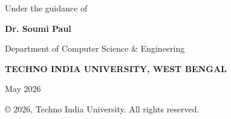 \documentclass[oneside]{ecsproject}     %
\begin{document}
\begin{titlepage}
\vspace{0.2cm}

{\small Under the guidance of}\par
{\normalsize\bfseries Dr. Soumi Paul}\par

\vspace{0.35cm}

{\small Department of Computer Science \& Engineering}\par
{\small\bfseries TECHNO INDIA UNIVERSITY, WEST BENGAL}\par

\vspace{0.1cm}

{\small May 2026}\par

\vfill

{\small © 2026, Techno India University. All rights reserved.}

\end{titlepage}

\end{document}
